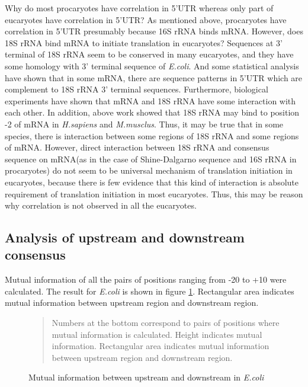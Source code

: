 Why do most procaryotes have correlation in 5'UTR whereas only part of
eucaryotes have correlation in 5'UTR? As mentioned above, procaryotes
have correlation in 5'UTR presumably because 16S rRNA binds mRNA.
However, does 18S rRNA bind mRNA to initiate translation in eucaryotes? 
Sequences at 3' terminal of 18S rRNA seem to be conserved in many
eucaryotes, and they have some homology with 3' terminal sequence of
{\it E.coli}\cite{label7078}. And some statistical analysis have shown
that in some mRNA, there are sequence patterns in 5'UTR which are
complement to 18S rRNA 3' terminal
sequences\cite{label7098}. Furthermore, biological experiments have
shown that mRNA and 18S rRNA have some interaction with each
other\cite{label7551}. In addition, above work showed that 18S rRNA may
bind to position -2 of mRNA in {\it H.sapiens} and {\it
M.musclus}. Thus, it may be true that in some species, there is
interaction between some regions of 18S rRNA and some regions of
mRNA. However, direct interaction between 18S rRNA and consensus
sequence on mRNA(as in the case of Shine-Dalgarno sequence and 16S rRNA
in procaryotes) do not seem to be universal mechanism of translation
initiation in eucaryotes, because there is few evidence that this kind
of interaction is absolute requirement of translation initiation in most
eucaryotes. Thus, this may be reason why correlation is not observed in
all the eucaryotes.

\subsection{Analysis of upstream and downstream consensus}

Mutual information of all the pairs of positions ranging from -20 to
+10 were calculated. The result for {\it E.coli} is shown in figure
\ref{ecoliud}. Rectangular area indicates mutual information between
upstream region and downstream region.

\begin{figure}
\begin{center}
\end{center}
\caption{Mutual information between upstream and downstream in {\it E.coli}}
\label{ecoliud}
\begin{quotation}
\begin{small}
Numbers at the bottom correspond to pairs of positions where mutual
 information is calculated. Height indicates mutual information. 
Rectangular area indicates mutual information between upstream region
 and downstream region.
\end{small}
\end{quotation}
\end{figure}

